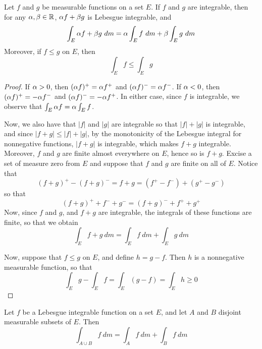 \begin{theorem}\label{10.3.5}
    Let $f$ and  $g$ be measurable functions on a set  $E$. If $f$ and  $g$ are
    integrable, then for any  $\alpha,\beta \in \mathbb{R}$,  $\alpha{f}+\beta{g}$ is Lebesgue
    integrable, and
    \begin{equation*}
        \int_E{\a{f}+\b{g} \ dm}=\a\int_E{f \ dm}+\b\int_E{g \ dm}
    \end{equation*}
    Moreover, if $f \leq g$ on  $E$, then
    \begin{equation*}
        \int_E{f} \leq \int_E{g}
    \end{equation*}
\end{theorem}
\begin{proof}
    If $\alpha>0$, then  $(\alpha{f})^+=\alpha{f^+}$ and $(\alpha{f})^-=\alpha{f^-}$. If $\alpha<0$,
    then $(\alpha{f})^+=-\alpha{f^-}$ and $(\alpha{f})^-=-\alpha{f^+}$. In either case, since
    $f$ is integrable, we observe that  $\int_E{\alpha{f}}=\alpha\int_E{f}$.

    Now, we also have that $|f|$ and  $|g|$ are integrable so that  $|f|+|g|$ is
    integrable, and since  $|f+g| \leq |f|+|g|$, by the monotonicity of the
    Lebesgue integral for nonnegative functions,  $|f+g|$ is integrable, which
    makes $f+g$ integrable. Moreover,  $f$ and  $g$ are finite almost everywhere
    on  $E$, hence so is $f+g$. Excise a set of measure zero from $E$ and suppose
    that  $f$ and  $g$ are finite on all of  $E$. Notice that
    \begin{equation*}
        (f+g)^+-(f+g)^-=f+g=(f^+-f^-)+(g^+-g^-)
    \end{equation*}
    so that
    \begin{equation*}
        (f+g)^++f^-+g^-=(f+g)^-+f^++g^+
    \end{equation*}
    Now, since $f$ and $g$, and $f+g$ are integrable, the integrals of these
    functions are finite, so that we obtain
    \begin{equation*}
        \int_E{f+g \ dm}=\int_E{f \ dm}+\int_E{g \ dm}
    \end{equation*}

    Now, suppose that $f \leq g$ on  $E$, and define  $h=g-f$. Then  $h$ is a
    nonnegative measurable function, so that
    \begin{equation*}
        \int_E{g}-\int_E{f}=\int_E{(g-f)}=\int_E{h} \geq 0
    \end{equation*}
\end{proof}
\begin{corollary}
    Let $f$ be a Lebesgue integrable function on a set $E$, and let $A$ and  $B$
    disjoint measurable subsets of  $E$. Then
    \begin{equation*}
        \int_{A \cup B}{f \ dm}=\int_A{f \ dm}+\int_B{f \ dm}
    \end{equation*}
\end{corollary}

